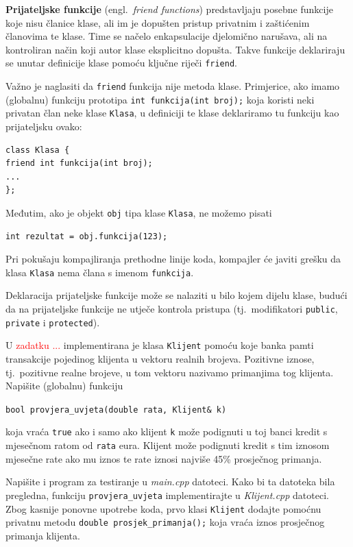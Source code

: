 \textbf{Prijateljske funkcije} (engl.\ \textit{friend functions}) 
predstavljaju posebne funkcije koje nisu članice klase, ali im je dopušten pristup privatnim i zaštićenim članovima te klase. 
Time se načelo enkapsulacije djelomično narušava, ali na kontroliran način koji autor klase eksplicitno dopušta.
Takve funkcije deklariraju se unutar definicije klase pomoću ključne riječi \texttt{friend}.
\medskip

Važno je naglasiti da \texttt{friend} funkcija nije metoda klase.
Primjerice,
ako imamo (globalnu) funkciju prototipa \texttt{int funkcija(int broj);}
koja koristi neki privatan član neke klase \texttt{Klasa},
u definiciji te klase deklariramo tu funkciju kao prijateljsku ovako:
\begin{verbatim}
class Klasa {
friend int funkcija(int broj);
...
};
\end{verbatim}
Međutim, ako je objekt \texttt{obj} tipa klase \texttt{Klasa},
ne možemo pisati
\begin{verbatim}
int rezultat = obj.funkcija(123);
\end{verbatim}
Pri pokušaju kompajliranja prethodne linije koda,
kompajler će javiti grešku da klasa \texttt{Klasa} nema člana s imenom \texttt{funkcija}.
\medskip

Deklaracija prijateljske funkcije može se nalaziti u bilo kojem dijelu klase, 
budući da na prijateljske funkcije ne utječe kontrola pristupa
(tj.\ modifikatori \texttt{public}, \texttt{private} i \texttt{protected}).

\begin{zadatak}\label{zad:klijent-friend}
    U \textcolor{red}{zadatku ...} implementirana je klasa \texttt{Klijent}
    pomoću koje banka pamti transakcije pojedinog klijenta u vektoru realnih brojeva.
    Pozitivne iznose, tj.\ pozitivne realne brojeve, u tom vektoru nazivamo primanjima tog klijenta.
    Napišite (globalnu) funkciju 
    \begin{center}
        \texttt{bool provjera\_uvjeta(double rata, Klijent\& k)}
    \end{center}
    koja vraća \texttt{true} ako i samo ako klijent \texttt{k} 
    može podignuti u toj banci kredit s mjesečnom ratom od \texttt{rata} eura.
    Klijent može podignuti kredit s tim iznosom mjesečne rate ako
    mu iznos te rate iznosi najviše 45\% prosječnog primanja.
    \medskip

    Napišite i program za testiranje u \textit{main.cpp} datoteci.
    Kako bi ta datoteka bila pregledna, funkciju \texttt{provjera\_uvjeta}
    implementirajte u \textit{Klijent.cpp} datoteci.
    Zbog kasnije ponovne upotrebe koda, prvo klasi \texttt{Klijent}
    dodajte pomoćnu privatnu metodu \texttt{double prosjek\_primanja();}
    koja vraća iznos prosječnog primanja klijenta.
\end{zadatak}


